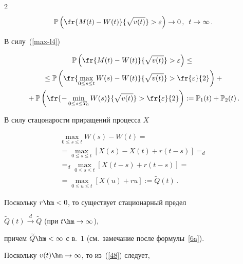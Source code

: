 \begin{multicols}{2}
\begin{equation}
\Pu \left(\fr{M(t)-W(t)}{\sqrt{v(t)}}> \varepsilon  \right) \to 0\,,


\enskip t \to \infty\,. 


\label{max-l3}


\end{equation}


В силу~(\ref{max-l4})


\begin{multline*}


\Pu \left(\fr{M(t)-W(t)}{\sqrt{v(t)}}> \varepsilon  \right) \leq{}\\


{}\leq 


\Pu \left(\fr{\max\limits_{0 \leq s \leq t}W(s)-W(t)}{\sqrt{v(t)}}> 


\fr{\varepsilon}{2}  \right)+{}


\\{} + \Pu \left(\fr{-\min\limits_{0 \leq s \leq T_0}W(s)}{\sqrt{v(t)}}> 


\fr{\varepsilon}{2}  \right):=\Pu_1(t)+\Pu_2(t)\,.


\end{multline*}


 В силу стацонарости приращений процесса $X$


\begin{multline}


\max\limits_{0 \leq s \leq t} W(s) - W(t)= {}\\


{}=


\max\limits_{0 \leq s \leq t} \left[  X(s)- X(t)+r(t-s)\right]=_d\\


{}=_d \max\limits_{0 \leq s \leq t}\left[  X(t-s)+r(t-s)\right]=\\


= \max\limits_{0 \leq u \leq t}\left[


X(u)+ru\right]:=\widetilde{Q}(t)\,.


\label{48}


\end{multline}


Поскольку  $r\hm<0$, то существует стационарный предел


$\widetilde{Q}(t) \xrightarrow{d} \widetilde {Q}$ (при $t \hm\to \infty$),


причем  $ \widetilde{Q}\hm<\infty$ с в.~1 (см.\ замечание после формулы~\eqref{6a}). 


Поскольку $v(t) \hm\to \infty$, то из~(\ref{48}) следует,



\end{multicols}
